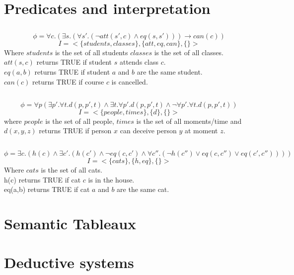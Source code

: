 \documentclass[]{article}
\begin{document}
\section{Predicates and interpretation}
\subsection{}
$$
\phi = \forall c.(\exists s.(\forall s'.(\neg att(s',c)\wedge eq(s,s')))\rightarrow can(c))
$$
$$I = <\{students, classes\},\{att, eq, can\}, \{\}>$$
Where $students$ is the set of all students $classes$ is the set of all classes.\\
$att(s,c)$ returns TRUE if student $s$ attends class $c$.\\
$eq(a,b)$ returns TRUE if student $a$ and $b$ are the same student.\\
$can(c)$ returns TRUE if course $c$ is cancelled.
\subsection{}
$$\phi = \forall p(\exists p'.\forall t.d(p,p',t) \wedge \exists t.\forall p'.d(p,p',t) \wedge \neg\forall p'.\forall t.d(p,p',t))$$
$$I = <\{people, times\}, \{d\}, \{\}>$$
where $people$ is the set of all people, $times$ is the set of all moments/time and $d(x,y,z)$ returns TRUE if person $x$ can deceive person $y$ at moment $z$.
\subsection{}
$$
\phi = \exists c.(h(c)\wedge \exists c'.(h(c') \wedge \neg eq(c,c')\wedge \forall c''.(\neg h(c'')\vee eq(c,c'')\vee eq(c',c''))))
$$
$$
I = <\{cats\},\{h, eq\}, \{\}>
$$
Where $cats$ is the set of all cats.\\
h(c) returns TRUE if cat $c$ is in the house.\\
eq(a,b) returns TRUE if cat $a$ and $b$ are the same cat.
\section{Semantic Tableaux}

\section{Deductive systems}
\end{document}

